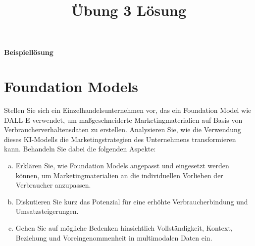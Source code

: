 \documentclass[12pt,ngerman]{AssignmentClass}
\title{Übung 3 Lösung} %
\begin{document}
	\maketitle

    \noindent %
    \begin{tcolorbox}[colback=gray!20, %
                      colframe=gray!20, %
                      boxrule=0pt, %
                      sharp corners, %
                      valign=center, %
                      halign=center, %
                      height=2cm] %
    \LARGE \bfseries Beispiellösung %
    \end{tcolorbox}

    \section{Foundation Models}
        Stellen Sie sich ein Einzelhandelsunternehmen vor, das ein Foundation Model wie DALL-E verwendet, um maßgeschneiderte Marketingmaterialien auf Basis von Verbraucherverhaltensdaten zu erstellen. Analysieren Sie, wie die Verwendung dieses KI-Modells die Marketingstrategien des Unternehmens transformieren kann. Behandeln Sie dabei die folgenden Aspekte:

        \begin{enumerate}[a)]
    		\item Erklären Sie, wie Foundation Models angepasst und eingesetzt werden können, um Marketingmaterialien an die individuellen Vorlieben der Verbraucher anzupassen.
    		\item Diskutieren Sie kurz das Potenzial für eine erhöhte Verbraucherbindung und Umsatzsteigerungen.
    		\item Gehen Sie auf mögliche Bedenken hinsichtlich Vollständigkeit, Kontext, Beziehung und Voreingenommenheit in multimodalen Daten ein.
    	\end{enumerate}
     
\end{document}
